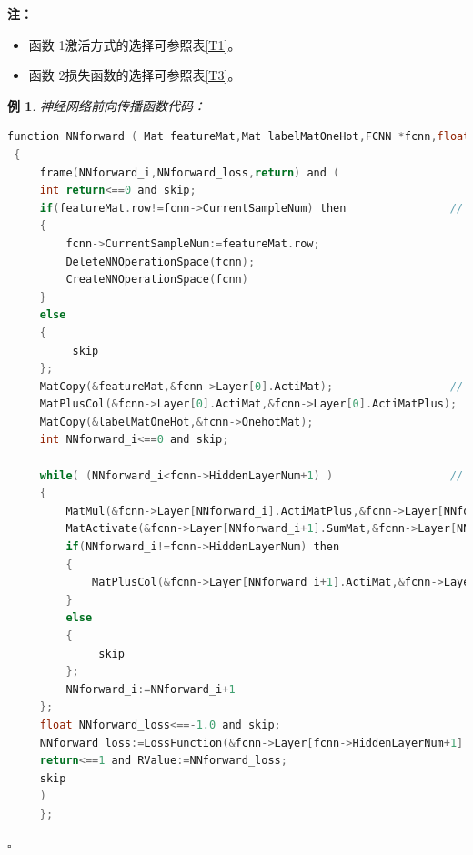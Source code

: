 \documentclass[UTF-8]{progbookcn}
\newtheorem{example}{例}[chapter]         %
\begin{document}
\begin{table}[!h]
\centering
\caption{前向传播相关函数}
\end{table}
\noindent\textbf{注：}
\begin{itemize}
  \item 函数 1激活方式的选择可参照表\ref{T1}。
  \item 函数 2损失函数的选择可参照表\ref{T3}。
\end{itemize}

\begin{example}
神经网络前向传播函数代码：
\begin{lstlisting}[language=C,caption={函数 3 NNforward}]
function NNforward ( Mat featureMat,Mat labelMatOneHot,FCNN *fcnn,float RValue )
 {
     frame(NNforward_i,NNforward_loss,return) and (
     int return<==0 and skip;
     if(featureMat.row!=fcnn->CurrentSampleNum) then                // 步骤1
     {
         fcnn->CurrentSampleNum:=featureMat.row;
         DeleteNNOperationSpace(fcnn);
         CreateNNOperationSpace(fcnn)
     }
     else
     {
          skip
     };
     MatCopy(&featureMat,&fcnn->Layer[0].ActiMat);                  // 步骤2
     MatPlusCol(&fcnn->Layer[0].ActiMat,&fcnn->Layer[0].ActiMatPlus);       // 步骤3
     MatCopy(&labelMatOneHot,&fcnn->OnehotMat);
     int NNforward_i<==0 and skip;

     while( (NNforward_i<fcnn->HiddenLayerNum+1) )                  // 步骤4
     {
         MatMul(&fcnn->Layer[NNforward_i].ActiMatPlus,&fcnn->Layer[NNforward_i+1].WeightBiasMat,&fcnn->Layer[NNforward_i+1].SumMat,RValue);
         MatActivate(&fcnn->Layer[NNforward_i+1].SumMat,&fcnn->Layer[NNforward_i+1].ActiMat,fcnn->Layer[NNforward_i+1].AcitFuncNum,RValue);
         if(NNforward_i!=fcnn->HiddenLayerNum) then
         {
             MatPlusCol(&fcnn->Layer[NNforward_i+1].ActiMat,&fcnn->Layer[NNforward_i+1].ActiMatPlus)
         }
         else
         {
              skip
         };
         NNforward_i:=NNforward_i+1
     };
     float NNforward_loss<==-1.0 and skip;
     NNforward_loss:=LossFunction(&fcnn->Layer[fcnn->HiddenLayerNum+1].ActiMat,&fcnn->OnehotMat,fcnn->LossFuncNum,RValue);      // 步骤5
     return<==1 and RValue:=NNforward_loss;
     skip
     )
     };
\end{lstlisting}\hfill$\square$
\end{example}
\end{document}
